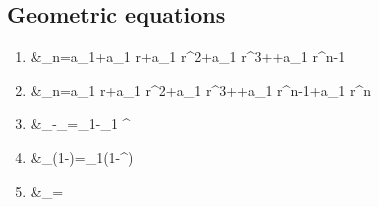 \documentclass[10pt]{article}
\begin{document}
\subsection{Geometric equations}

\begin{enumerate}

  \item &_n=a_1+a_1 r+a_1 r^2+a_1 r^3+\cdots+a_1 r^{n-1} \\

    \item &_n=a_1 r+a_1 r^2+a_1 r^3+\cdots+a_1 r^{n-1}+a_1 r^n \\

    \item &_{}-_{}=_1-_1 ^{} \\
    
    \item &_{}(1-)=_1\left(1-^{}\right) \\

    \item &_{}=\\

\end{enumerate}
\end{document}
